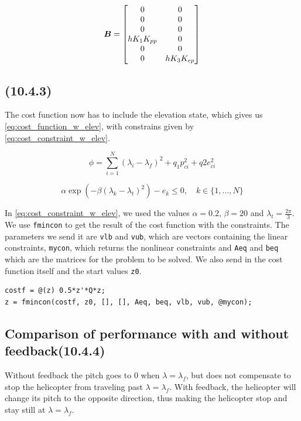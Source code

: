 \begin{equation}\label{eq:matrice_4.2_B}
	\bm{B} =
	\begin{bmatrix}
		0				& 0				\\
		0				& 0				\\
		0				& 0				\\
		hK_{1}K_{pp}	& 0				\\
		0				& 0				\\
		0				& hK_{3}K_{ep}	\\
	\end{bmatrix}
\end{equation}

\subsection{(10.4.3)}

The cost function now has to include the elevation state, which gives us \eqref{eq:cost_function_w_elev}, with constrains given by \eqref{eq:cost_constraint_w_elev}. 

\begin{equation} \label {eq:cost_function_w_elev}
	\phi = \sum\limits_{i=1}^N (\lambda_i - \lambda_f)^2 + q_1 p_{ci}^2 + q2 e_{ci}^2
\end{equation}

\begin{equation} \label{eq:cost_constraint_w_elev}
	\alpha \exp (-\beta (\lambda_k - \lambda_t)^2) -e_k \leq 0, \quad k \in \{ 1, ..., N \}
\end{equation}

In \eqref{eq:cost_constraint_w_elev}, we used the values $\alpha = 0.2$, $\beta = 20$ and $\lambda_t = \frac{2 \pi}{3}$.
We use \texttt{fmincon} to get the result of the cost function with the constraints. The parameters we send it are  \texttt{vlb} and \texttt{vub}, which are vectors containing the linear constraints, \texttt{mycon}, which returns the nonlinear constraints and \texttt{Aeq} and \texttt{beq} which are the matrices for the problem to be solved. We also send in the cost function itself and the start values \texttt{z0}.
\begin{lstlisting}
costf = @(z) 0.5*z'*Q*z;
z = fmincon(costf, z0, [], [], Aeq, beq, vlb, vub, @mycon);
\end{lstlisting}

\subsection{Comparison of performance with and without feedback(10.4.4)}
Without feedback the pitch goes to 0 when $\lambda = \lambda_f$, but does not compensate to stop the helicopter from traveling past $\lambda = \lambda_f$. With feedback, the helicopter will change its pitch to the opposite direction, thus making the helicopter stop and stay still at $\lambda = \lambda_f$. 

